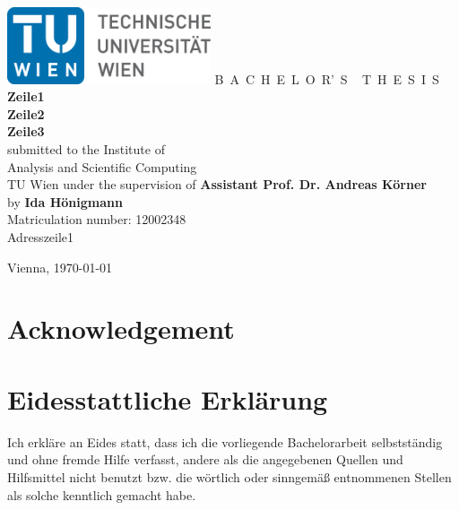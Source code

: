\documentclass[a4paper,11pt,bibliography=totoc,listof=totoc,headinclude=true,cleardoublepage=empty,oneside]{scrbook}
\begin{document}

\begin{titlepage}
	\begin{center}
		\includegraphics[width=0.45\textwidth]{fig/TULogo.eps}
		\vskip 1cm
		{\LARGE B~\Large A~C~H~E~L~O~R'~S ~ \LARGE T~\Large H~E~S~I~S}
		\vskip 8mm
		{\huge\bfseries Zeile1 \\ Zeile2 \\ Zeile3 \\[1ex]}
		\vskip 1cm
		\large 
		submitted to the    
		\vskip 0.75cm
		{\Large Institute of\\[1ex] Analysis and Scientific Computing}\\[1ex]
		{\Large TU Wien}
		\vskip0.75cm
		under the supervision of
		\vskip0.75cm
		{\Large\bfseries Assistant Prof. Dr. Andreas Körner}\\
		\vskip0.75cm
		by
		\vskip 0.75cm
		{\Large\bfseries Ida Hönigmann}\\[1ex]
		{Matriculation number: 12002348}\\[1ex]
		{Adresszeile1}
	\end{center}
	
	\vfill
	
	\small
	Vienna, \today 
	\vspace*{-15mm}
\end{titlepage}

\cleardoublepage

\chapter*{Acknowledgement}
\thispagestyle{empty}

\cleardoublepage

\chapter*{Eidesstattliche Erkl\"arung}
\thispagestyle{empty}
\thispagestyle{empty}

\vspace*{2cm}

Ich erkl\"are an Eides statt, dass ich die vorliegende Bachelorarbeit selbstst\"andig und ohne fremde Hilfe verfasst, andere als die angegebenen Quellen und Hilfsmittel nicht benutzt bzw. die w\"ortlich oder sinngem\"a{\ss} entnommenen Stellen als solche kenntlich gemacht habe.
\end{document}

